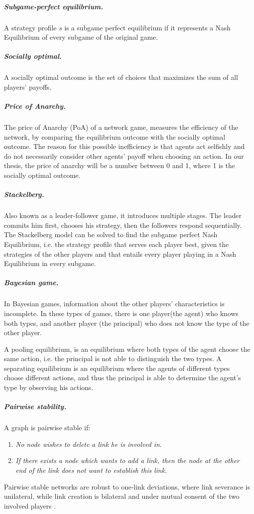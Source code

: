 \subparagraph{Subgame-perfect equilibrium.}
A strategy profile $s$ is a subgame perfect equilibrium if it represents a Nash Equilibrium of every subgame of the original game.
\subparagraph{Socially optimal.}
A socially optimal outcome is the set of choices that maximizes the sum of all players' payoffs. 
\subparagraph{Price of Anarchy.}
The price of Anarchy (PoA) of a network game, measures the efficiency of the network, by comparing the equilibrium outcome with the socially optimal outcome. The reason for this possible inefficiency is that agents act selfishly and do not necessarily consider other agents' payoff when choosing an action. In our thesis, the price of anarchy will be a number between 0 and 1, where 1 is the socially optimal outcome.
\subparagraph{Stackelberg.}
Also known as a leader-follower game, it introduces multiple stages. The leader commits him first, chooses his strategy, then the followers respond sequentially. The Stackelberg model can be solved to find the subgame perfect Nash Equilibrium, i.e. the strategy profile that serves each player best, given the strategies of the other players and that entails every player playing in a Nash Equilibrium in every subgame.
\subparagraph{Bayesian game.}
In Bayesian games, information about the other players' characteristics is incomplete. In these types of games, there is one player(the agent) who knows both types, and another player (the principal) who does not know the type of the other player. 

A pooling equilibrium, is an equilibrium where both types of the agent choose the same action, i.e. the principal is not able to distinguish the two types. 
A separating equilibrium is an equilibrium where the agents of different types choose different actions, and thus the principal is able to determine the agent's type by observing his actions.
\subparagraph{Pairwise stability.}
A graph is pairwise stable if:
 \begin{enumerate}
\item \textit{No node wishes to delete a link he is involved in.}
\item \textit{If there exists a node which wants to add a link, then the node at the other end of the link does not want to establish this link.}
\end{enumerate} 
Pairwise stable networks are robust to one-link deviations, where link
severance is unilateral, while link creation is bilateral and under mutual consent of the two involved
players \cite{calvo2009pairwise}.

